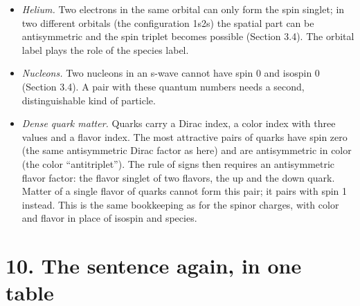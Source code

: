 \documentclass[
  10pt,
]{article}
\providecommand{\tightlist}{%
  \setlength{\itemsep}{0pt}\setlength{\parskip}{0pt}}
\begin{document}
\begin{itemize}
\tightlist
\item
  \emph{Helium.} Two electrons in the same orbital can only form the
  spin singlet; in two different orbitals (the configuration 1s2s) the
  spatial part can be antisymmetric and the spin triplet becomes
  possible (Section 3.4). The orbital label plays the role of the
  species label.
\item
  \emph{Nucleons.} Two nucleons in an s-wave cannot have spin 0 and
  isospin 0 (Section 3.4). A pair with these quantum numbers needs a
  second, distinguishable kind of particle.
\item
  \emph{Dense quark matter.} Quarks carry a Dirac index, a color index
  with three values and a flavor index. The most attractive pairs of
  quarks have spin zero (the same antisymmetric Dirac factor as here)
  and are antisymmetric in color (the color ``antitriplet''). The rule
  of signs then requires an antisymmetric flavor factor: the flavor
  singlet of two flavors, the up and the down quark. Matter of a single
  flavor of quarks cannot form this pair; it pairs with spin 1 instead.
  This is the same bookkeeping as for the spinor charges, with color and
  flavor in place of isospin and species.
\end{itemize}

\hypertarget{the-sentence-again-in-one-table}{%
\section{10. The sentence again, in one
table}\label{the-sentence-again-in-one-table}}
\end{document}
